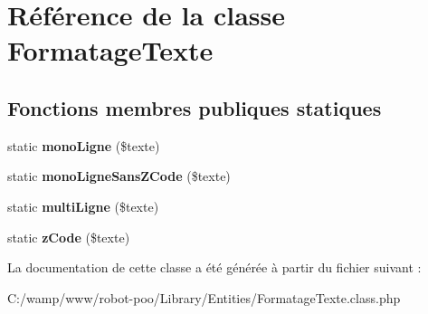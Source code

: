 \hypertarget{class_library_1_1_entities_1_1_formatage_texte}{\section{Référence de la classe Formatage\+Texte}
\label{class_library_1_1_entities_1_1_formatage_texte}
}
\subsection*{Fonctions membres publiques statiques}
\begin{DoxyCompactItemize}
\item 
\hypertarget{class_library_1_1_entities_1_1_formatage_texte_a24f0c6f5b02156401db3f76e3ea5ff6f}{static {\bfseries mono\+Ligne} (\$texte)}\label{class_library_1_1_entities_1_1_formatage_texte_a24f0c6f5b02156401db3f76e3ea5ff6f}

\item 
\hypertarget{class_library_1_1_entities_1_1_formatage_texte_a101f1a628e7c2ef73085a60bdd7c853c}{static {\bfseries mono\+Ligne\+Sans\+Z\+Code} (\$texte)}\label{class_library_1_1_entities_1_1_formatage_texte_a101f1a628e7c2ef73085a60bdd7c853c}

\item 
\hypertarget{class_library_1_1_entities_1_1_formatage_texte_abd9053a6c6e6cbfffb5d177d30fc179d}{static {\bfseries multi\+Ligne} (\$texte)}\label{class_library_1_1_entities_1_1_formatage_texte_abd9053a6c6e6cbfffb5d177d30fc179d}

\item 
\hypertarget{class_library_1_1_entities_1_1_formatage_texte_a8ffbb003ce8dce9c759e7b92382d2fcb}{static {\bfseries z\+Code} (\$texte)}\label{class_library_1_1_entities_1_1_formatage_texte_a8ffbb003ce8dce9c759e7b92382d2fcb}

\end{DoxyCompactItemize}


La documentation de cette classe a été générée à partir du fichier suivant \+:\begin{DoxyCompactItemize}
\item 
C\+:/wamp/www/robot-\/poo/\+Library/\+Entities/Formatage\+Texte.\+class.\+php\end{DoxyCompactItemize}
